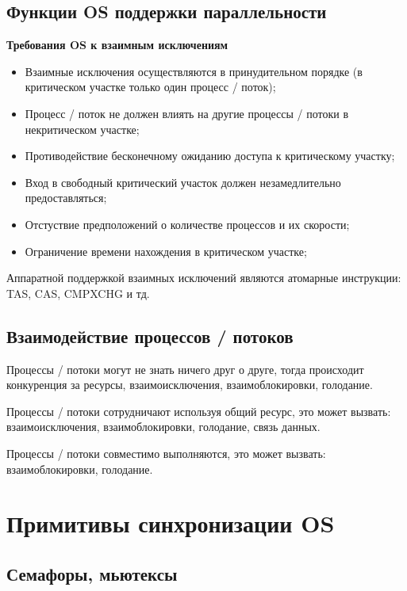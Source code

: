 \documentclass[bachelor, och, book]{SCWorks}
\theoremstyle{remark}
\begin{document}
    
    \subsection{Функции OS поддержки параллельности}

    \textbf{Требования OS к взаимным исключениям}
    \begin{itemize}[label=$\bullet$]
        \item Взаимные исключения осуществляются в принудительном порядке (в критическом участке только один процесс / поток);
        \item Процесс / поток не должен влиять на другие процессы / потоки в некритическом участке;
        \item Противодействие бесконечному ожиданию доступа к критическому участку;
        \item Вход в свободный критический участок должен незамедлительно предоставляться;
        \item Отстуствие предположений о количестве процессов и их скорости;
        \item Ограничение времени нахождения в критическом участке;
    \end{itemize}

    Аппаратной поддержкой взаимных исключений являются атомарные инструкции: TAS, CAS, CMPXCHG и тд.

    \subsection{Взаимодействие процессов / потоков}

    Процессы / потоки могут не знать ничего друг о друге, тогда происходит конкуренция за ресурсы, взаимоисключения, взаимоблокировки, голодание.

    Процессы / потоки сотрудничают используя общий ресурс, это может вызвать: взаимоисключения, взаимоблокировки, голодание, связь данных.

    Процессы / потоки совместимо выполняются, это может вызвать: взаимоблокировки, голодание.


    \section{Примитивы синхронизации OS}

    \subsection{Семафоры, мьютексы}
\end{document}
